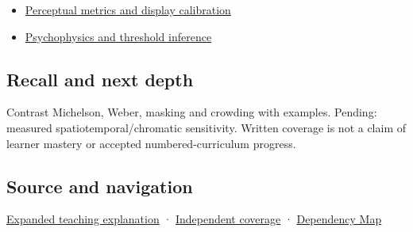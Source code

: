 \begin{itemize}
\tightlist
\item
  \hyperref[appendix-b2c1846508bf]{Perceptual metrics and display calibration}
\item
  \hyperref[appendix-1759f03e8ce7]{Psychophysics and threshold inference}
\end{itemize}

\subsection{Recall and next depth}\label{appendix-b3aa9e8e01ad-recall-and-next-depth}

\hypertarget{appendix-b3aa9e8e01ad-recall-and-next-depth}{}

Contrast Michelson, Weber, masking and crowding with examples. Pending: measured spatiotemporal/chromatic sensitivity. Written coverage is not a claim of learner mastery or accepted numbered-curriculum progress.

\subsection{Source and navigation}\label{appendix-b3aa9e8e01ad-source-and-navigation}

\hypertarget{appendix-b3aa9e8e01ad-source-and-navigation}{}

\hyperref[04-visual-computing-ii-ch042-visibility-is-about-contrast-conditions-and-tasks]{Expanded teaching explanation} · \hyperref[appendix-fd090d982a15-xr01---independent-seeing-and-representation-source]{Independent coverage} · \hyperref[appendix-4ad47bdd269a]{Dependency Map}
